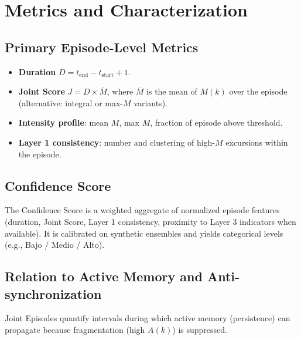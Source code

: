 \section{Metrics and Characterization}

\subsection{Primary Episode-Level Metrics}

\begin{itemize}
    \item \textbf{Duration} $D = t_\mathrm{end} - t_\mathrm{start} + 1$.
    \item \textbf{Joint Score} $J = D \times \overline{M}$, where $\overline{M}$ is the mean of $M(k)$ over the episode (alternative: integral or max-$M$ variants).
    \item \textbf{Intensity profile}: mean $M$, max $M$, fraction of episode above threshold.
    \item \textbf{Layer 1 consistency}: number and clustering of high-$M$ excursions within the episode.
\end{itemize}

\subsection{Confidence Score}

The Confidence Score is a weighted aggregate of normalized episode features (duration, Joint Score, Layer 1 consistency, proximity to Layer 3 indicators when available). It is calibrated on synthetic ensembles and yields categorical levels (e.g., Bajo / Medio / Alto).

\subsection{Relation to Active Memory and Anti-synchronization}

Joint Episodes quantify intervals during which active memory (persistence) can propagate because fragmentation (high $A(k)$) is suppressed.
